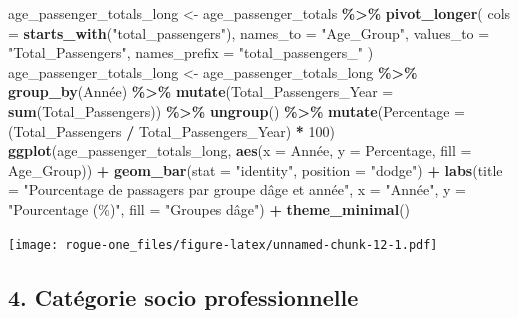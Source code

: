 \documentclass[
]{article}
\newenvironment{Shaded}{\begin{snugshade}}{\end{snugshade}}
\newcommand{\AttributeTok}[1]{\textcolor[rgb]{0.13,0.29,0.53}{#1}}
\newcommand{\DecValTok}[1]{\textcolor[rgb]{0.00,0.00,0.81}{#1}}
\newcommand{\FunctionTok}[1]{\textcolor[rgb]{0.13,0.29,0.53}{\textbf{#1}}}
\newcommand{\NormalTok}[1]{#1}
\newcommand{\OtherTok}[1]{\textcolor[rgb]{0.56,0.35,0.01}{#1}}
\newcommand{\SpecialCharTok}[1]{\textcolor[rgb]{0.81,0.36,0.00}{\textbf{#1}}}
\newcommand{\StringTok}[1]{\textcolor[rgb]{0.31,0.60,0.02}{#1}}
\begin{document}
\begin{Shaded}
\begin{Highlighting}[]
\NormalTok{age\_passenger\_totals\_long }\OtherTok{\textless{}{-}}\NormalTok{ age\_passenger\_totals }\SpecialCharTok{\%\textgreater{}\%}
  \FunctionTok{pivot\_longer}\NormalTok{(}
    \AttributeTok{cols =} \FunctionTok{starts\_with}\NormalTok{(}\StringTok{"total\_passengers"}\NormalTok{),}
    \AttributeTok{names\_to =} \StringTok{"Age\_Group"}\NormalTok{,}
    \AttributeTok{values\_to =} \StringTok{"Total\_Passengers"}\NormalTok{,}
    \AttributeTok{names\_prefix =} \StringTok{"total\_passengers\_"}
\NormalTok{  )}
\NormalTok{age\_passenger\_totals\_long }\OtherTok{\textless{}{-}}\NormalTok{ age\_passenger\_totals\_long }\SpecialCharTok{\%\textgreater{}\%}
  \FunctionTok{group\_by}\NormalTok{(Année) }\SpecialCharTok{\%\textgreater{}\%}
  \FunctionTok{mutate}\NormalTok{(}\AttributeTok{Total\_Passengers\_Year =} \FunctionTok{sum}\NormalTok{(Total\_Passengers)) }\SpecialCharTok{\%\textgreater{}\%}
  \FunctionTok{ungroup}\NormalTok{() }\SpecialCharTok{\%\textgreater{}\%}
  \FunctionTok{mutate}\NormalTok{(}\AttributeTok{Percentage =}\NormalTok{ (Total\_Passengers }\SpecialCharTok{/}\NormalTok{ Total\_Passengers\_Year) }\SpecialCharTok{*} \DecValTok{100}\NormalTok{)}
\FunctionTok{ggplot}\NormalTok{(age\_passenger\_totals\_long, }\FunctionTok{aes}\NormalTok{(}\AttributeTok{x =}\NormalTok{ Année, }\AttributeTok{y =}\NormalTok{ Percentage, }\AttributeTok{fill =}\NormalTok{ Age\_Group)) }\SpecialCharTok{+}
  \FunctionTok{geom\_bar}\NormalTok{(}\AttributeTok{stat =} \StringTok{"identity"}\NormalTok{, }\AttributeTok{position =} \StringTok{"dodge"}\NormalTok{) }\SpecialCharTok{+}
  \FunctionTok{labs}\NormalTok{(}\AttributeTok{title =} \StringTok{"Pourcentage de passagers par groupe d\textquotesingle{}âge et année"}\NormalTok{,}
       \AttributeTok{x =} \StringTok{"Année"}\NormalTok{,}
       \AttributeTok{y =} \StringTok{"Pourcentage (\%)"}\NormalTok{,}
       \AttributeTok{fill =} \StringTok{"Groupes d\textquotesingle{}âge"}\NormalTok{) }\SpecialCharTok{+}
  \FunctionTok{theme\_minimal}\NormalTok{()}
\end{Highlighting}
\end{Shaded}

\texttt{[image: rogue-one\_files/figure-latex/unnamed-chunk-12-1.pdf]}

\hypertarget{catuxe9gorie-socio-professionnelle}{%
\subsection{4. Catégorie socio
professionnelle}\label{catuxe9gorie-socio-professionnelle}}
\end{document}
